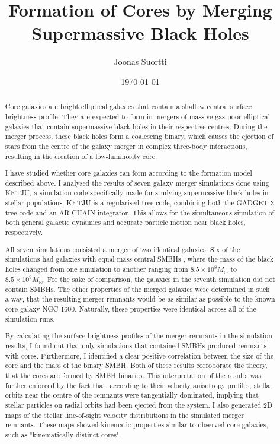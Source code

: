 \documentclass[english, twoside]{HYgradu}
\title{Formation of Cores by Merging Supermassive Black Holes}
\author{Joonas Suortti}
\date{\today}
\begin{document}
\maketitle

\onehalfspacing

\begin{abstract}
Core galaxies are bright elliptical galaxies that contain a shallow central surface brightness profile. They are expected to form in mergers of massive gas-poor elliptical galaxies that contain supermassive black holes in their respective centres. During the merger process, these black holes form a coalescing binary, which causes the ejection of stars from the centre of the galaxy merger in complex three-body interactions, resulting in the creation of a low-luminosity core.

I have studied whether core galaxies can form according to the formation model described above. I analysed the results of seven galaxy merger simulations done using KETJU, a simulation code specifically made for studying supermassive black holes in stellar populations. KETJU is a regularised tree-code, combining both the GADGET-3 tree-code and an AR-CHAIN integrator. This allows for the simultaneous simulation of both general galactic dynamics and accurate particle motion near black holes, respectively.

All seven simulations consisted a merger of two identical galaxies. Six of the simulations had galaxies with equal mass central SMBHs , where the mass of the black holes changed from one simulation to another ranging from $8.5 \times 10^8 M_\odot$ to $8.5 \times 10^9 M_\odot$. For the sake of comparison, the galaxies in the seventh simulation did not contain SMBHs. The other properties of the merged galaxies were determined in such a way, that the resulting merger remnants would be as similar as possible to the known core galaxy NGC 1600. Naturally, these properties were identical across all of the simulation runs. 

By calculating the surface brightness profiles of the merger remnants in the simulation results, I found out that only simulations that contained SMBHs produced remnants with cores. Furthermore, I identified a clear positive correlation between the size of the core and the mass of the binary SMBH. Both of these results corroborate the theory, that the cores are formed by SMBH binaries. This interpretation of the results was further enforced by the fact that, according to their velocity anisotropy profiles, stellar orbits near the centre of the remnants were tangentially dominated, implying that stellar particles on radial orbits had been ejected from the system. I also generated 2D maps of the stellar line-of-sight velocity distributions in the simulated merger remnants. These maps showed kinematic properties similar to observed core galaxies, such as "kinematically distinct cores".


\end{abstract}
\end{document}

